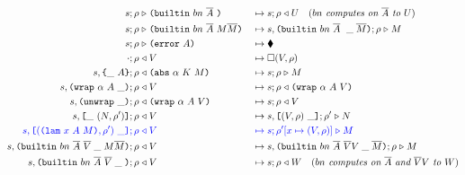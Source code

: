 \begin{figure}[!ht]
\begin{subfigure}[c]{\linewidth}
{\begin{alignat*}{2}
      s; \rho &\compute \builtin{bn}{\repetition{A}}{} &{}\mapsto{}& s;\rho \return U \quad (\textit{$bn$ computes on $\repetition{A}$ to $U$})\\
      s; \rho &\compute \builtin{bn}{\repetition{A}}{M \repetition{M}} &{}\mapsto{}& s,\inBuiltin{bn}{\repetition{A}}{}{\_}{\repetition{M}};\rho \compute M\\
      s; \rho &\compute \error{A} &{}\mapsto{}& \ckerror{}\\
      \cdot; \rho &\return V &{}\mapsto{}& \square (V, \rho)\\
      s,\inInstLeftFrame{A}; \rho &\return \abs{\alpha}{K}{M} &{}\mapsto{}& s;\rho \compute{M} \\
      s,\inWrapRightFrame{\alpha}{A}; \rho &\return V &{}\mapsto{}& s;\rho \return \wrap{\alpha}{A}{V}\\
      s,\inUnwrapFrame{}; \rho &\return \wrap{\alpha}{A}{V} &{}\mapsto{}& s;\rho \return V\\
      s,\inAppLeftFrame{(N,\rho^{\prime})}; \rho &\return V &{}\mapsto{}& s, \inAppRightFrame{(V,\rho)};\rho^{\prime} \compute N\\
      \blue{s,\inAppRightFrame{(\lam{x}{A}{M}, \rho^{\prime})}; \rho} &\breturn V &{}\bmapsto{}& \blue{s;\rho^{\prime}[x\mapsto (V,\rho)] \compute M}\\  %
      s,  \inBuiltin{bn}{\repetition{A}}{\repetition{V}}{\_}{M \repetition{M}}{}; \rho&\return V &{}\mapsto{}& s, \inBuiltin{bn}{\repetition{A}}{\repetition{V} V}{\_}{\repetition{M}};\rho \compute M\\
      s,\inBuiltin {bn} {\repetition{A}} {\repetition{V}}{\_}{}; \rho &\return V 
                                                &{}\mapsto{}& s;\rho \return W \quad (\textit{$bn$ computes on $\repetition{A}$ and $\repetition{V}V$ to $W$})\\
\end{alignat*}
}
\end{subfigure}
\end{figure}


